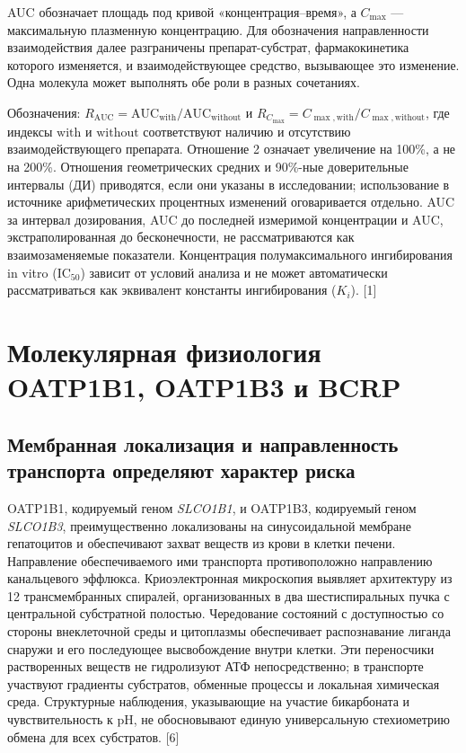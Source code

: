 \documentclass[11pt]{article}
\begin{document}
AUC обозначает площадь под кривой «концентрация--время», а \(C_{\max}\) --- максимальную плазменную концентрацию. Для обозначения направленности взаимодействия далее разграничены препарат-субстрат, фармакокинетика которого изменяется, и взаимодействующее средство, вызывающее это изменение. Одна молекула может выполнять обе роли в разных сочетаниях.

Обозначения: \(R_{\mathrm{AUC}}=\mathrm{AUC}_{\mathrm{with}}/\mathrm{AUC}_{\mathrm{without}}\) и \(R_{C_{\max}}=C_{\max,\mathrm{with}}/C_{\max,\mathrm{without}}\), где индексы \(\mathrm{with}\) и \(\mathrm{without}\) соответствуют наличию и отсутствию взаимодействующего препарата. Отношение 2 означает увеличение на 100\%, а не на 200\%. Отношения геометрических средних и 90\%-ные доверительные интервалы (ДИ) приводятся, если они указаны в исследовании; использование в источнике арифметических процентных изменений оговаривается отдельно. AUC за интервал дозирования, AUC до последней измеримой концентрации и AUC, экстраполированная до бесконечности, не рассматриваются как взаимозаменяемые показатели. Концентрация полумаксимального ингибирования in vitro (\(\mathrm{IC}_{50}\)) зависит от условий анализа и не может автоматически рассматриваться как эквивалент константы ингибирования (\(K_i\)). [1]

\section{Молекулярная физиология OATP1B1, OATP1B3 и BCRP}

\subsection{Мембранная локализация и направленность транспорта определяют характер риска}

OATP1B1, кодируемый геном \textit{SLCO1B1}, и OATP1B3, кодируемый геном \textit{SLCO1B3}, преимущественно локализованы на синусоидальной мембране гепатоцитов и обеспечивают захват веществ из крови в клетки печени. Направление обеспечиваемого ими транспорта противоположно направлению канальцевого эффлюкса. Криоэлектронная микроскопия выявляет архитектуру из 12 трансмембранных спиралей, организованных в два шестиспиральных пучка с центральной субстратной полостью. Чередование состояний с доступностью со стороны внеклеточной среды и цитоплазмы обеспечивает распознавание лиганда снаружи и его последующее высвобождение внутри клетки. Эти переносчики растворенных веществ не гидролизуют АТФ непосредственно; в транспорте участвуют градиенты субстратов, обменные процессы и локальная химическая среда. Структурные наблюдения, указывающие на участие бикарбоната и чувствительность к pH, не обосновывают единую универсальную стехиометрию обмена для всех субстратов. [6]
\end{document}
